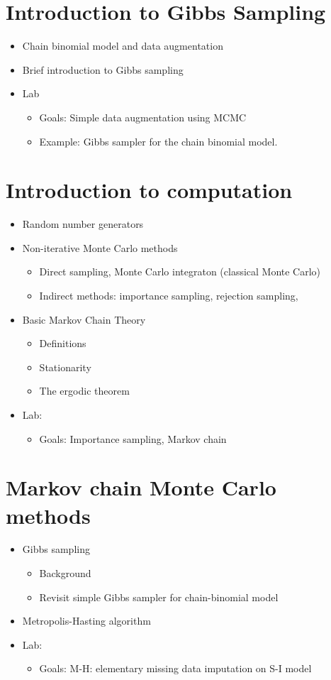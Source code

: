 \documentclass[11pt]{article}
\begin{document}
\section{Introduction to Gibbs Sampling}
\begin{itemize}
\item Chain binomial model and data augmentation
\item Brief introduction to Gibbs sampling
\item Lab
\begin{itemize}
\item Goals: Simple data augmentation using MCMC
\item Example: Gibbs sampler for the chain binomial model.
\end{itemize}
\end{itemize}


\section{Introduction to computation}
 \begin{itemize}
 \item Random number generators 
\item {Non-iterative Monte Carlo methods}
\begin{itemize}
\item Direct sampling, Monte Carlo integraton (classical Monte Carlo)
\item Indirect methods: importance sampling, rejection sampling,
\end{itemize}
\item{Basic Markov Chain Theory} 
\begin{itemize}
\item Definitions
\item Stationarity
\item The ergodic theorem
\end{itemize}
\item Lab: 
\begin{itemize}
\item Goals: Importance sampling, Markov chain
\end{itemize} 
\end{itemize}

\section{Markov chain Monte Carlo methods}
\begin{itemize}
\item Gibbs sampling 
\begin{itemize}
\item Background 
\item Revisit simple Gibbs sampler for chain-binomial model 
\end{itemize}
\item{Metropolis-Hasting algorithm}
\item Lab: 
\begin{itemize}
\item Goals: M-H: elementary missing data imputation on S-I model
\end{itemize}
\end{itemize}
\end{document}

